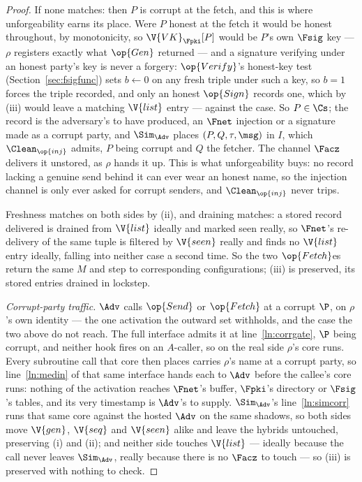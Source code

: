 \documentclass[10pt,oneside,openany]{book}
\theoremstyle{accentdef}
\theoremstyle{accentplain}
\begin{document}
\begin{proof}
If none matches: then $P$ is corrupt at the fetch, and this is where unforgeability earns its
place. Were $P$ honest at the fetch it would be honest throughout, by monotonicity, so
$\V{VK}_{\Fpki}[P]$ would be $P$'s own $\Fsig$ key --- $\rho$ registers exactly what $\op{Gen}$
returned --- and a signature verifying under an honest party's key is never a forgery:
$\op{Verify}$'s honest-key test (Section~\ref{sec:fsigfunc}) sets $b \gets 0$ on any fresh triple
under such a key, so $b = 1$ forces the triple recorded, and only an honest $\op{Sign}$ records
one, which by (iii) would leave a matching $\V{list}$ entry --- against the case. So $P \in \Cs$;
the record is the adversary's to have produced, an $\Fnet$ injection or a signature made as a
corrupt party, and $\Sim_{\Adv}$ places $(P,Q,\tau,\msg)$ in $I$, which $\Clean_{\op{inj}}$ admits,
$P$ being corrupt and $Q$ the fetcher. The channel $\Facz$ delivers it unstored, as $\rho$ hands it up. This
is what unforgeability buys: no record lacking a genuine send behind it can ever wear an honest
name, so the injection channel is only ever asked for corrupt senders, and $\Clean_{\op{inj}}$
never trips.

Freshness matches on both sides by (ii), and draining matches: a stored record delivered is
drained from $\V{list}$ ideally and marked seen really, so $\Fnet$'s re-delivery of the same tuple
is filtered by $\V{seen}$ really and finds no $\V{list}$ entry ideally, falling into neither case a
second time. So the two $\op{Fetch}$es return the same $M$ and step to corresponding
configurations; (iii) is preserved, its stored entries drained in lockstep.

\emph{Corrupt-party traffic.} $\Adv$ calls $\op{Send}$ or $\op{Fetch}$ at a corrupt $\P$, on
$\rho$'s own identity --- the one activation the outward set withholds, and the case the two
above do not reach. The full interface admits it at line~\ref{ln:corrgate}, $\P$ being corrupt,
and neither hook fires on an $A$-caller, so on the real side $\rho$'s core runs. Every subroutine
call that core then places carries $\rho$'s name at a corrupt party, so line~\ref{ln:medin} of
that same interface hands each to $\Adv$ before the callee's core runs: nothing of the activation
reaches $\Fnet$'s buffer, $\Fpki$'s directory or $\Fsig$'s tables, and its very timestamp is
$\Adv$'s to supply. $\Sim_{\Adv}$'s line~\ref{ln:simcorr}
runs that same core against the hosted $\Adv$ on the same shadows, so both sides move $\V{gen}$,
$\V{seq}$ and $\V{seen}$ alike and leave the hybrids untouched, preserving (i) and (ii); and
neither side touches $\V{list}$ --- ideally because the call never leaves $\Sim_{\Adv}$, really
because there is no $\Facz$ to touch --- so (iii) is preserved with nothing to check.


\end{proof}
\end{document}
